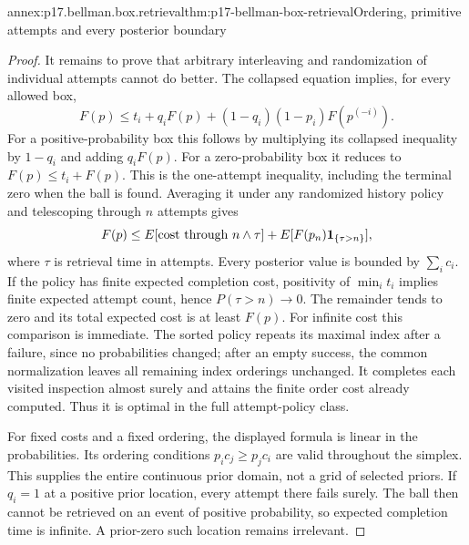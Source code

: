 \begin{annexitem}{annex:p17.bellman.box.retrieval}{thm:p17-bellman-box-retrieval}{Ordering, primitive attempts and every posterior boundary}
\begin{proof}
It remains to prove that arbitrary
interleaving and randomization
of individual attempts cannot
do better. The collapsed equation
implies, for every allowed box,
\[
 F(p)\leq t_i+q_iF(p)
                 +(1-q_i)(1-p_i)F(p^{(-i)}).
\]
For a positive-probability box
this follows by multiplying
its collapsed inequality by
\(1-q_i\) and adding \(q_iF(p)\).
For a zero-probability box it
reduces to \(F(p)\leq t_i+F(p)\).
This is the one-attempt
inequality, including the
terminal zero when the ball
is found. Averaging it under
any randomized history policy
and telescoping through \(n\)
attempts gives
\[
 F(p)\leq E[\hbox{cost through }n\wedge\tau]
               +E[F(p_n)\mathbf1_{\{\tau>n\}}],
\]
where \(\tau\) is retrieval
time in attempts. Every
posterior value is bounded
by \(\sum_i c_i\).
If the policy has finite
expected completion cost,
positivity of \(\min_i t_i\)
implies finite expected
attempt count, hence
\(P(\tau>n)\to0\).
The remainder tends to zero
and its total expected cost
is at least \(F(p)\).
For infinite cost this
comparison is immediate.
The sorted policy repeats its
maximal index after a failure,
since no probabilities changed;
after an empty success, the
common normalization leaves
all remaining index orderings
unchanged. It completes each
visited inspection almost surely
and attains the finite order
cost already computed. Thus
it is optimal in the full
attempt-policy class.

For fixed costs and a fixed
ordering, the displayed
formula is linear in the
probabilities. Its ordering
conditions \(p_ic_j\geq p_jc_i\)
are valid throughout the
simplex. This supplies the
entire continuous prior domain,
not a grid of selected priors.
If \(q_i=1\) at a positive
prior location, every attempt
there fails surely. The ball
then cannot be retrieved on
an event of positive probability,
so expected completion time
is infinite. A prior-zero
such location remains irrelevant.


\end{proof}
\end{annexitem}
